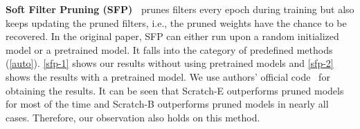 \textbf{Soft Filter Pruning (SFP)~\cite{he2018sfp}} prunes filters every epoch during training but also keeps updating the pruned filters, i.e., the pruned weights have the chance to be recovered. In the original paper, SFP can either run upon a random initialized model or a pretrained model. It falls into the category of predefined methods (\autoref{auto}). \autoref{sfp-1} shows our results without using pretrained models and \autoref{sfp-2} shows the results with a pretrained model. We use authors' official code~\cite{he2018sfp} for obtaining the results. It can be seen that Scratch-E outperforms pruned models for most of the time and Scratch-B outperforms pruned models in nearly all cases. Therefore, our observation also holds on this method.

\setlength{\tabcolsep}{4pt}
\renewcommand{\arraystretch}{1.25}
\begin{table}[!htbp]
\centering
\small
{}
\end{table}

